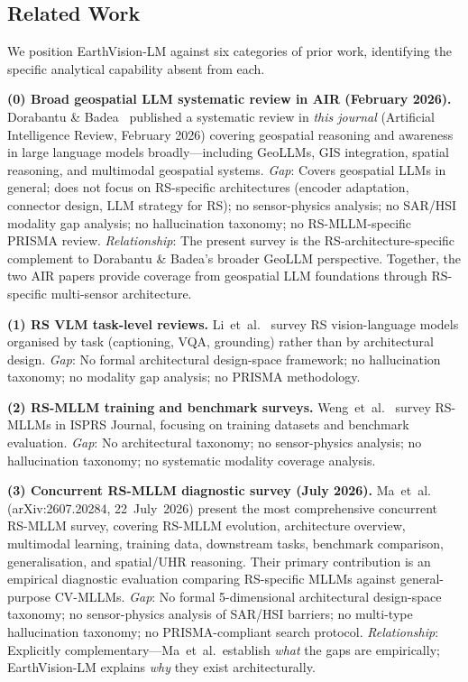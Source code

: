 \subsection{Related Work}\label{sec2:related}

We position EarthVision-LM against six categories of prior work, identifying
the specific analytical capability absent from each.

\textbf{(0) Broad geospatial LLM systematic review in AIR (February 2026).}
Dorabantu \& Badea~\cite{dorabantu2026geollm} published a systematic review in
\emph{this journal} (Artificial Intelligence Review, February 2026) covering geospatial
reasoning and awareness in large language models broadly---including GeoLLMs,
GIS integration, spatial reasoning, and multimodal geospatial systems.
\emph{Gap}: Covers geospatial LLMs in general; does not focus on RS-specific architectures
(encoder adaptation, connector design, LLM strategy for RS); no sensor-physics analysis;
no SAR/HSI modality gap analysis; no hallucination taxonomy; no RS-MLLM-specific PRISMA review.
\emph{Relationship}: The present survey is the RS-architecture-specific complement to
Dorabantu \& Badea's broader GeoLLM perspective. Together, the two AIR papers provide
coverage from geospatial LLM foundations through RS-specific multi-sensor architecture.

\textbf{(1) RS VLM task-level reviews.}
Li~et~al.~\cite{li2024survey} survey RS vision-language models organised by
task (captioning, VQA, grounding) rather than by architectural design.
\emph{Gap}: No formal architectural design-space framework; no hallucination
taxonomy; no modality gap analysis; no PRISMA methodology.

\textbf{(2) RS-MLLM training and benchmark surveys.}
Weng~et~al.~\cite{weng2025isprs} survey RS-MLLMs in ISPRS Journal, focusing
on training datasets and benchmark evaluation.
\emph{Gap}: No architectural taxonomy; no sensor-physics analysis; no
hallucination taxonomy; no systematic modality coverage analysis.

\textbf{(3) Concurrent RS-MLLM diagnostic survey (July 2026).}
Ma~et~al.~\cite{ma2026dsorsp} (arXiv:2607.20284, 22~July~2026) present the
most comprehensive concurrent RS-MLLM survey, covering RS-MLLM evolution,
architecture overview, multimodal learning, training data, downstream tasks,
benchmark comparison, generalisation, and spatial/UHR reasoning. Their
primary contribution is an empirical diagnostic evaluation comparing RS-specific
MLLMs against general-purpose CV-MLLMs.
\emph{Gap}: No formal 5-dimensional architectural design-space taxonomy; no
sensor-physics analysis of SAR/HSI barriers; no multi-type hallucination
taxonomy; no PRISMA-compliant search protocol.
\emph{Relationship}: Explicitly complementary---Ma~et~al.\ establish
\emph{what} the gaps are empirically; EarthVision-LM explains \emph{why}
they exist architecturally.

